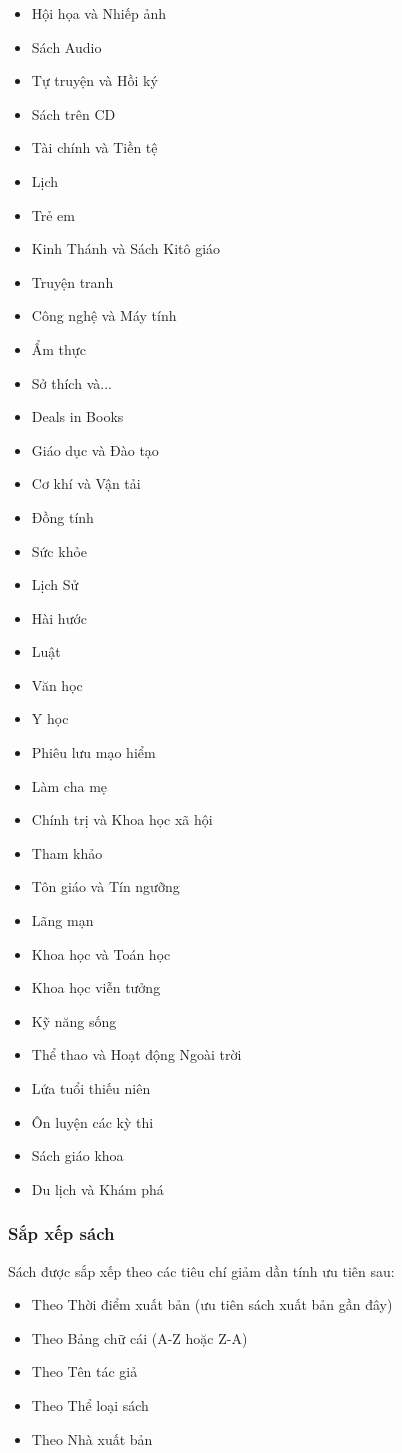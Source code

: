 \documentclass[12pt,a4paper]{report}
\begin{document}
			\begin{itemize}
				\item Hội họa và Nhiếp ảnh
				\item Sách Audio
				\item Tự truyện và Hồi ký
				\item Sách trên CD
				\item Tài chính và Tiền tệ
				\item Lịch
				\item Trẻ em
				\item Kinh Thánh và Sách Kitô giáo
				\item Truyện tranh
				\item Công nghệ và Máy tính
				\item Ẩm thực
				\item Sở thích và...
				\item Deals in Books
				\item Giáo dục và Đào tạo
				\item Cơ khí và Vận tải
				\item Đồng tính
				\item Sức khỏe
				\item Lịch Sử
				\item Hài hước
				\item Luật
				\item Văn học
				\item Y học
				\item Phiêu lưu mạo hiểm
				\item Làm cha mẹ
				\item Chính trị và Khoa học xã hội
				\item Tham khảo
				\item Tôn giáo và Tín ngưỡng
				\item Lãng mạn
				\item Khoa học và Toán học
				\item Khoa học viễn tưởng
				\item Kỹ năng sống
				\item Thể thao và Hoạt động Ngoài trời
				\item Lứa tuổi thiếu niên
				\item Ôn luyện các kỳ thi
				\item Sách giáo khoa
				\item Du lịch và Khám phá
			\end{itemize}
			\subsubsection{Sắp xếp sách}
			Sách được sắp xếp theo các tiêu chí giảm dần tính ưu tiên sau:
			\begin{itemize}
				\item Theo Thời điểm xuất bản (ưu tiên sách xuất bản gần đây)
				\item Theo Bảng chữ cái (A-Z hoặc Z-A)
				\item Theo Tên tác giả
				\item Theo Thể loại sách
				\item Theo Nhà xuất bản
			\end{itemize}
\end{document}
